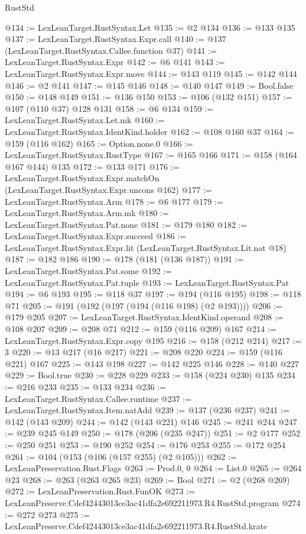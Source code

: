 \begin{lexlean}{RustStd}
\begin{coremodule}
@134 := LexLeanTarget.RustSyntax.Let
@135 := @2 @134
@136 := @133 @135
@137 := LexLeanTarget.RustSyntax.Expr.call
@140 := @137 (LexLeanTarget.RustSyntax.Callee.function @37)
@141 := LexLeanTarget.RustSyntax.Expr
@142 := @6 @141
@143 := LexLeanTarget.RustSyntax.Expr.move
@144 := @143 @119
@145 := @142 @144
@146 := @2 @141
@147 := @145 @146
@148 := @140 @147
@149 := Bool.false
@150 := @148 @149
@151 := @136 @150
@153 := @106 (@132 @151)
@157 := @107 (@110 @37) @128 @131
@158 := @6 @134
@159 := LexLeanTarget.RustSyntax.Let.mk
@160 := LexLeanTarget.RustSyntax.IdentKind.holder
@162 := @108 @160 @37
@164 := @159 (@116 @162)
@165 := Option.none.{0}
@166 := LexLeanTarget.RustSyntax.RustType
@167 := @165 @166
@171 := @158 (@164 @167 @144) @135
@172 := @133 @171
@176 := LexLeanTarget.RustSyntax.Expr.matchOn (LexLeanTarget.RustSyntax.Expr.uncons @162)
@177 := LexLeanTarget.RustSyntax.Arm
@178 := @6 @177
@179 := LexLeanTarget.RustSyntax.Arm.mk
@180 := LexLeanTarget.RustSyntax.Pat.none
@181 := @179 @180
@182 := LexLeanTarget.RustSyntax.Expr.succeed
@186 := LexLeanTarget.RustSyntax.Expr.lit (LexLeanTarget.RustSyntax.Lit.nat @18)
@187 := @182 @186
@190 := @178 (@181 (@136 @187))
@191 := LexLeanTarget.RustSyntax.Pat.some
@192 := LexLeanTarget.RustSyntax.Pat.tuple
@193 := LexLeanTarget.RustSyntax.Pat
@194 := @6 @193
@195 := @118 @37
@197 := @194 (@116 @195)
@198 := @118 @71
@205 := @191 (@192 (@197 (@194 (@116 @198) (@2 @193))))
@206 := @179 @205
@207 := LexLeanTarget.RustSyntax.IdentKind.operand
@208 := @108 @207
@209 := @208 @71
@212 := @159 (@116 @209) @167
@214 := LexLeanTarget.RustSyntax.Expr.copy @195
@216 := @158 (@212 @214)
@217 := 3
@220 := @13 @217 (@16 @217)
@221 := @208 @220
@224 := @159 (@116 @221) @167
@225 := @143 @198
@227 := @142 @225 @146
@228 := @140 @227
@229 := Bool.true
@230 := @228 @229
@233 := @158 (@224 @230) @135
@234 := @216 @233
@235 := @133 @234
@236 := LexLeanTarget.RustSyntax.Callee.runtime
@237 := LexLeanTarget.RustSyntax.Item.natAdd
@239 := @137 (@236 @237)
@241 := @142 (@143 @209)
@244 := @142 (@143 @221) @146
@245 := @241 @244
@247 := @239 @245 @149
@250 := @178 (@206 (@235 @247))
@251 := @2 @177
@252 := @250 @251
@253 := @190 @252
@254 := @176 @253
@255 := @172 @254
@261 := @104 (@153 (@106 (@157 @255) (@2 @105)))
@262 := LexLeanPreservation.Rust.Flags
@263 := Prod.{0, 0}
@264 := List.{0}
@265 := @264 @23
@268 := @263 (@263 @265 @23)
@269 := Bool
@271 := @2 (@268 @269)
@272 := LexLeanPreservation.Rust.FunOK
@273 := LexLeanPreserve.Cdef42443013ce3ac41dfa2e692211973.R4.RustStd.program
@274 := @272 @273
@275 := LexLeanPreserve.Cdef42443013ce3ac41dfa2e692211973.R4.RustStd.krate

\end{coremodule}
\end{lexlean}
